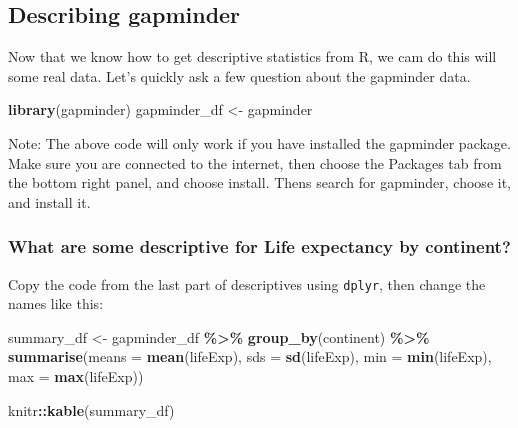 \documentclass[
]{book}
\newenvironment{Shaded}{\begin{snugshade}}{\end{snugshade}}
\newcommand{\AttributeTok}[1]{\textcolor[rgb]{0.13,0.29,0.53}{#1}}
\newcommand{\FunctionTok}[1]{\textcolor[rgb]{0.13,0.29,0.53}{\textbf{#1}}}
\newcommand{\NormalTok}[1]{#1}
\newcommand{\OtherTok}[1]{\textcolor[rgb]{0.56,0.35,0.01}{#1}}
\newcommand{\SpecialCharTok}[1]{\textcolor[rgb]{0.81,0.36,0.00}{\textbf{#1}}}
\begin{document}
\hypertarget{describing-gapminder}{%
\subsection{Describing gapminder}\label{describing-gapminder}}

Now that we know how to get descriptive statistics from R, we cam do this will some real data. Let's quickly ask a few question about the gapminder data.

\begin{Shaded}
\begin{Highlighting}[]
\FunctionTok{library}\NormalTok{(gapminder)}
\NormalTok{gapminder\_df }\OtherTok{\textless{}{-}}\NormalTok{ gapminder}
\end{Highlighting}
\end{Shaded}

Note: The above code will only work if you have installed the gapminder package. Make sure you are connected to the internet, then choose the Packages tab from the bottom right panel, and choose install. Thens search for gapminder, choose it, and install it.

\hypertarget{what-are-some-descriptive-for-life-expectancy-by-continent}{%
\subsubsection{What are some descriptive for Life expectancy by continent?}\label{what-are-some-descriptive-for-life-expectancy-by-continent}}

Copy the code from the last part of descriptives using \texttt{dplyr}, then change the names like this:

\begin{Shaded}
\begin{Highlighting}[]
\NormalTok{summary\_df }\OtherTok{\textless{}{-}}\NormalTok{ gapminder\_df }\SpecialCharTok{\%\textgreater{}\%}
               \FunctionTok{group\_by}\NormalTok{(continent) }\SpecialCharTok{\%\textgreater{}\%}
               \FunctionTok{summarise}\NormalTok{(}\AttributeTok{means =} \FunctionTok{mean}\NormalTok{(lifeExp),}
                         \AttributeTok{sds =} \FunctionTok{sd}\NormalTok{(lifeExp),}
                         \AttributeTok{min =} \FunctionTok{min}\NormalTok{(lifeExp),}
                         \AttributeTok{max =} \FunctionTok{max}\NormalTok{(lifeExp))}

\NormalTok{knitr}\SpecialCharTok{::}\FunctionTok{kable}\NormalTok{(summary\_df)}
\end{Highlighting}
\end{Shaded}
\end{document}
